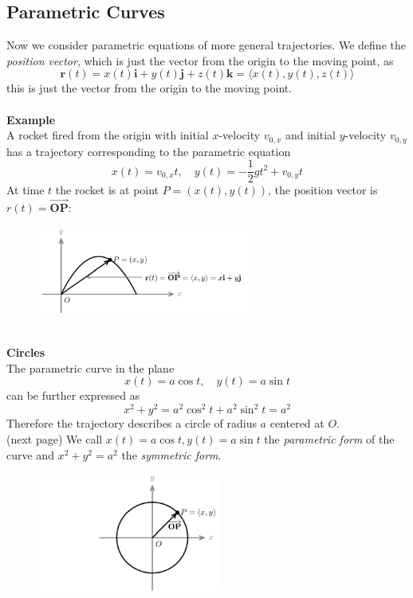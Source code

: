 \documentclass{report}
\begin{document}
\subsection{Parametric Curves} %
Now we consider parametric equations of more general trajectories. We define the 
\textit{position vector}, which is just the vector from the origin to the moving point, as 
\begin{equation*}
\mathbf{r}(t)=x(t)\mathbf{i}+y(t)\mathbf{j}+
z(t)\mathbf{k}=\langle x(t),y(t),z(t)\rangle
\end{equation*}
this is just the vector from the origin to the moving point.\\
\vspace{1mm}\\
\textbf{Example}\\
A rocket fired from the origin with initial $x$-velocity $v_{0,x}$ and initial 
$y$-velocity $v_{0,y}$ has a trajectory corresponding to the parametric equation
\begin{equation*}
x(t)=v_{0,x}t,\quad y(t)=-\frac{1}{2}gt^2+v_{0,y}t
\end{equation*}
At time $t$ the rocket is at point $P=(x(t),y(t))$, the position vector is $r(t)
=\overrightarrow{\mathbf{OP}}$:
\begin{figure}[h]
\includegraphics[width=7cm]{Capture89}\\
\centering
\end{figure}\\
\textbf{Circles}\\
The parametric curve in the plane
\begin{equation*}
x(t)=a\cos t,\quad y(t)=a\sin t
\end{equation*}
can be further expressed as 
\begin{equation*}
x^2+y^2=a^2\cos^2t+a^2\sin^2t=a^2
\end{equation*}
Therefore the trajectory describes a circle of radius $a$ centered at $O$.\\
(next page)
\newpage
\noindent We call $x(t)=a\cos t,y(t)=a\sin t$ the \textit{parametric form} of the curve and 
$x^2+y^2=a^2$ the \textit{symmetric form}. 
\begin{figure}[h]
\includegraphics[width=6cm]{Capture90}\\
\centering
\end{figure}\\
\end{document}
